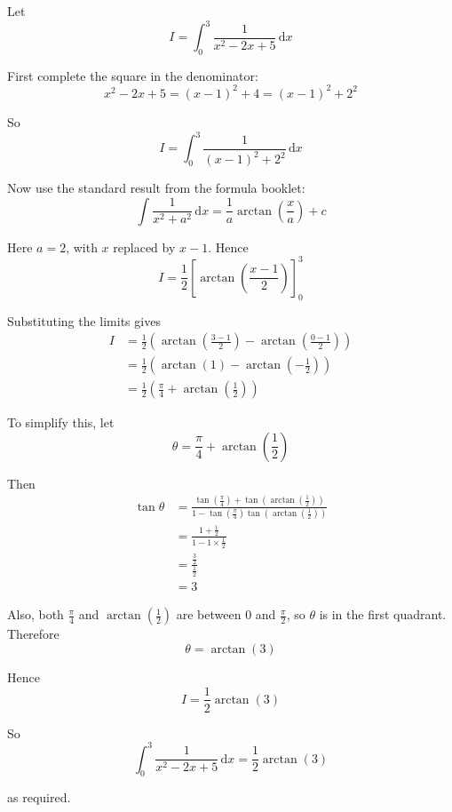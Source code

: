 \documentclass[leqno]{article}
\begin{document}
\begin{enumerate}[
  label=\textbf{\arabic*.},
  leftmargin=*,
  topsep=0pt,
  partopsep=0pt,
  parsep=0pt
]
\vspace*{10pt}

\begin{djsSolution}
Let
\[
I=\int_{0}^{3}\frac{1}{x^2-2x+5}\,\mathrm{d}x
\]

First complete the square in the denominator:
\[
x^2-2x+5=(x-1)^2+4=(x-1)^2+2^2
\]

So
\[
I=\int_{0}^{3}\frac{1}{(x-1)^2+2^2}\,\mathrm{d}x
\]

Now use the standard result from the formula booklet:
\[
\int \frac{1}{x^2+a^2}\,\mathrm{d}x=\frac{1}{a}\arctan\left(\frac{x}{a}\right)+c
\]

Here \(a=2\), with \(x\) replaced by \(x-1\). Hence
\[
I=\frac{1}{2}\left[\arctan\left(\frac{x-1}{2}\right)\right]_{0}^{3}
\]

Substituting the limits gives
\begin{align*}
I&=\frac{1}{2}\left(\arctan\left(\frac{3-1}{2}\right)-\arctan\left(\frac{0-1}{2}\right)\right)\\
&=\frac{1}{2}\left(\arctan (1)-\arctan\left(-\frac12\right)\right)\\
&=\frac{1}{2}\left(\frac{\pi}{4}+\arctan\left(\frac12\right)\right)
\end{align*}

To simplify this, let
\[
\theta=\frac{\pi}{4}+\arctan\left(\frac12\right)
\]

Then
\begin{align*}
\tan\theta
&=\frac{\tan\left(\frac{\pi}{4}\right)+\tan\left(\arctan\left(\frac12\right)\right)}
{1-\tan\left(\frac{\pi}{4}\right)\tan\left(\arctan\left(\frac12\right)\right)}\\
&=\frac{1+\frac12}{1-1\times\frac12}\\
&=\frac{\frac32}{\frac12}\\
&=3
\end{align*}

Also, both \(\frac{\pi}{4}\) and \(\arctan\left(\frac12\right)\) are between \(0\) and \(\frac{\pi}{2}\), so \(\theta\) is in the first quadrant. Therefore
\[
\theta=\arctan (3)
\]

Hence
\[
I=\frac{1}{2}\arctan (3)
\]

So
\[
\int_{0}^{3}\frac{1}{x^2-2x+5}\,\mathrm{d}x=\frac{1}{2}\arctan (3)
\]

as required.
\end{djsSolution}


\newpage


\questionitem


\end{enumerate}
\end{document}
